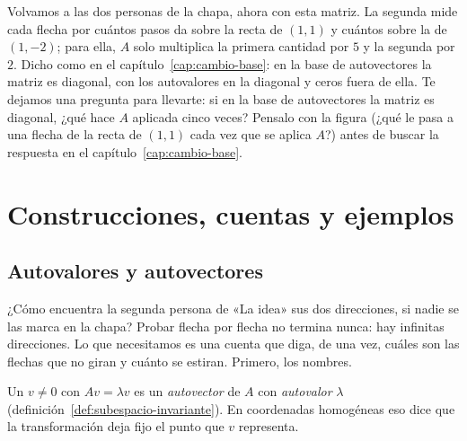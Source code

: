 Volvamos a las dos personas de la chapa, ahora con esta matriz. La segunda mide cada flecha por
cuántos pasos da sobre la recta de \((1,1)\) y cuántos sobre la de \((1,-2)\); para ella,
\(A\) solo multiplica la primera cantidad por \(5\) y la segunda por \(2\). Dicho como en el
capítulo~\ref{cap:cambio-base}: en la base de autovectores la matriz es diagonal, con los
autovalores en la diagonal y ceros fuera de ella. Te dejamos una pregunta para llevarte:
si en la base de autovectores la matriz es diagonal, ¿qué hace \(A\) aplicada cinco veces?
Pensalo con la figura (¿qué le pasa a una flecha de la recta de \((1,1)\) cada vez que se
aplica \(A\)?) antes de buscar la respuesta en el capítulo~\ref{cap:cambio-base}.


\section{Construcciones, cuentas y ejemplos}

\subsection{Autovalores y autovectores}\label{sec:autovalores}

¿Cómo encuentra la segunda persona de «La idea» sus dos direcciones, si nadie se las marca en
la chapa? Probar flecha por flecha no termina nunca: hay infinitas direcciones. Lo que
necesitamos es una cuenta que diga, de una vez, cuáles son las flechas que no giran y cuánto se
estiran. Primero, los nombres.

Un \(v\neq0\) con \(Av=\lambda v\) es un \emph{autovector} de \(A\) con \emph{autovalor}
\(\lambda\) (definición~\ref{def:subespacio-invariante}). En coordenadas homogéneas eso dice
que la transformación deja fijo el punto que \(v\) representa.

